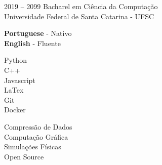 \documentclass[11pt]{developercv} %
\begin{document}


\begin{entrylist}
	\entry
		{2019 -- 2099}
		{Bacharel em Ciência da Computação}
		{\\Universidade Federal de Santa Catarina - UFSC}
		{}
\end{entrylist}


\begin{minipage}[t]{0.3\textwidth}
	\vspace{-\baselineskip} %
 
	\textbf{Portuguese} - Nativo \\
	\textbf{English} - Fluente
\end{minipage}
\hfill
\begin{minipage}[t]{0.3\textwidth}
	\vspace{-\baselineskip} %
 
    Python\\
    C++\\
    Javascript\\
    LaTex\\
    Git\\
    Docker\\
    
    
\end{minipage}
\hfill
\begin{minipage}[t]{0.3\textwidth}
	\vspace{-\baselineskip} %
 
    Compressão de Dados\\
    Computação Gráfica\\
    Simulações Físicas\\
    Open Source
\end{minipage}

\end{document}
